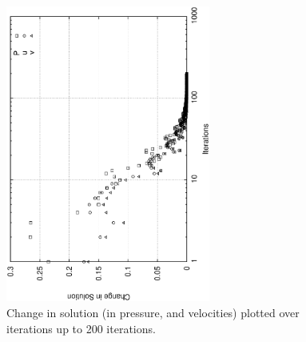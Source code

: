 \documentclass[a4paper, 10pt]{article}
\begin{document}
\begin{enumerate}[I]
\begin{enumerate} [a]
  \end{enumerate}
    \begin{figure}
      \centering
      \includegraphics[width=0.6\textwidth, angle = -90]{../plot/stability/convergence/conv.eps}
      \caption{Change in solution (in pressure, and velocities) plotted over iterations up to 200 iterations.}
      \label{ch1}
    \end{figure}
    

\end{enumerate}
\end{document}
